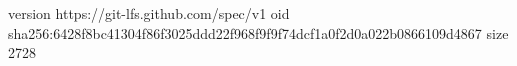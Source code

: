 version https://git-lfs.github.com/spec/v1
oid sha256:6428f8bc41304f86f3025ddd22f968f9f9f74dcf1a0f2d0a022b0866109d4867
size 2728
